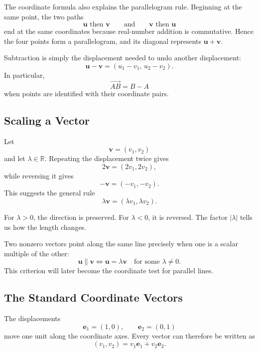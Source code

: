 The coordinate formula also explains the parallelogram rule.  Beginning at the
same point, the two paths
\[
\mathbf u\text{ then }\mathbf v
\qquad\text{and}\qquad
\mathbf v\text{ then }\mathbf u
\]
end at the same coordinates because real-number addition is commutative.
Hence the four points form a parallelogram, and its diagonal represents
$\mathbf u+\mathbf v$.

Subtraction is simply the displacement needed to undo another displacement:
\[
\mathbf u-\mathbf v
=
(u_1-v_1,\,u_2-v_2).
\]
In particular,
\[
\overrightarrow{AB}=B-A
\]
when points are identified with their coordinate pairs.

\subsection{Scaling a Vector}

Let
\[
\mathbf v=(v_1,v_2)
\]
and let $\lambda\in\mathbb R$.  Repeating the displacement twice gives
\[
2\mathbf v=(2v_1,2v_2),
\]
while reversing it gives
\[
-\mathbf v=(-v_1,-v_2).
\]
This suggests the general rule
\[
\lambda\mathbf v=(\lambda v_1,\lambda v_2).
\]

For $\lambda>0$, the direction is preserved.  For $\lambda<0$, it is reversed.
The factor $|\lambda|$ tells us how the length changes.

\begin{center}
\end{center}

Two nonzero vectors point along the same line precisely when one is a scalar
multiple of the other:
\[
\mathbf u\parallel\mathbf v
\iff
\mathbf u=\lambda\mathbf v
\quad\text{for some }\lambda\neq0.
\]
This criterion will later become the coordinate test for parallel lines.

\subsection{The Standard Coordinate Vectors}

The displacements
\[
\mathbf e_1=(1,0),
\qquad
\mathbf e_2=(0,1)
\]
move one unit along the coordinate axes.  Every vector can therefore be written
as
\[
(v_1,v_2)=v_1\mathbf e_1+v_2\mathbf e_2.
\]

